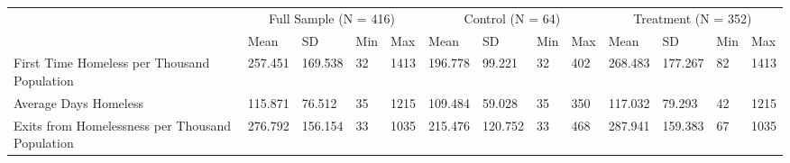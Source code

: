 \begin{tabular}{lllllllllllll}
\toprule
 & \multicolumn{4}{c}{Full Sample (N = 416)} & \multicolumn{4}{c}{Control (N = 64)} & \multicolumn{4}{c}{Treatment (N = 352)} \\
 & Mean & SD & Min & Max & Mean & SD & Min & Max & Mean & SD & Min & Max \\
\midrule
First Time Homeless per Thousand Population & 257.451 & 169.538 & 32 & 1413 & 196.778 & 99.221 & 32 & 402 & 268.483 & 177.267 & 82 & 1413 \\
Average Days Homeless & 115.871 & 76.512 & 35 & 1215 & 109.484 & 59.028 & 35 & 350 & 117.032 & 79.293 & 42 & 1215 \\
Exits from Homelessness per Thousand Population & 276.792 & 156.154 & 33 & 1035 & 215.476 & 120.752 & 33 & 468 & 287.941 & 159.383 & 67 & 1035 \\
\bottomrule
\end{tabular}

